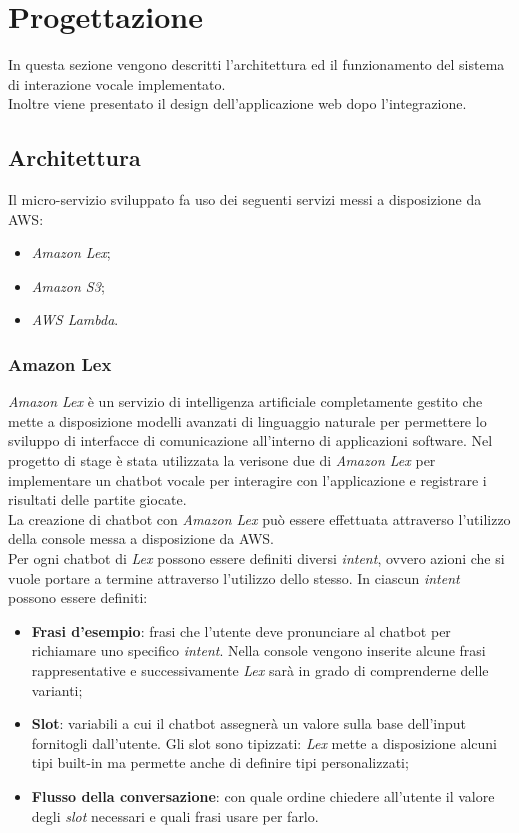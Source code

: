 \section{Progettazione}
In questa sezione vengono descritti l'architettura ed il funzionamento del sistema di interazione vocale implementato. \\ 
Inoltre viene presentato il design dell'applicazione web dopo l'integrazione.
	\subsection{Architettura}
	Il micro-servizio sviluppato fa uso dei seguenti servizi messi a disposizione da \gls{AWS}:
	\begin{itemize}
		\item \emph{Amazon Lex};
		\item \emph{Amazon S3};
		\item \emph{AWS Lambda}.
	\end{itemize}
		\subsubsection{Amazon Lex}
		\emph{Amazon Lex} è un servizio di intelligenza artificiale completamente gestito che mette a disposizione 
		modelli avanzati di linguaggio naturale per permettere lo sviluppo di interfacce di comunicazione all'interno 
		di applicazioni software. Nel progetto di stage è stata utilizzata la verisone due di \emph{Amazon Lex} per 
		implementare un \gls{chatbot} vocale per interagire con l'applicazione e registrare i risultati delle partite 
		giocate. \\
		
		\noindent La creazione di \gls{chatbot} con \emph{Amazon Lex} può essere effettuata attraverso l'utilizzo della console messa a disposizione da \gls{AWS}. \\
		Per ogni \gls{chatbot} di \emph{Lex} possono essere definiti diversi \emph{intent}, ovvero azioni che si
		vuole portare a termine attraverso l'utilizzo dello stesso. In ciascun \emph{intent} possono essere definiti:
		\begin{itemize}
			\item \textbf{Frasi d'esempio}: frasi che l'utente deve pronunciare al \gls{chatbot} per richiamare uno
			specifico \emph{intent}. Nella console vengono inserite alcune frasi rappresentative e successivamente \emph{Lex} sarà in grado di comprenderne delle varianti; 
			\item \textbf{Slot}: variabili a cui il \gls{chatbot} assegnerà un valore sulla base
			dell'input fornitogli dall'utente. Gli slot sono tipizzati:	\emph{Lex} mette a disposizione alcuni tipi built-in ma permette anche di definire tipi personalizzati;
			\item \textbf{Flusso della conversazione}: con quale ordine chiedere all'utente il valore degli \emph{slot} necessari e quali frasi usare per farlo.		
		\end{itemize}
		

